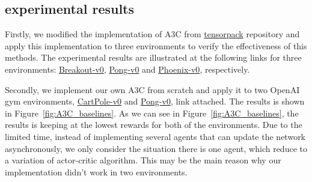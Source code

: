 \subsection{experimental results}
Firstly, we modified the implementation of A3C from \href{https://github.com/ppwwyyxx/tensorpack}{tensorpack} repository and
apply this implementation to three environments to verify the effectiveness of this methods.
The experimental results are illustrated at the following links for three environments:
\href{https://gym.openai.com/evaluations/eval_i9E40nAQuOTiSa0bxYBA#reproducibility}{Breakout-v0}, 
\href{https://gym.openai.com/evaluations/eval_mvXuxP13SSacO01UIhsg#reproducibility}{Pong-v0} and 
\href{https://gym.openai.com/evaluations/eval_Gva8XrEvTQi63KOd5Gyq1Q#reproducibility}{Phoenix-v0}, respectively.

Secondly, we implement our own A3C from scratch and apply it to two OpenAI gym environments, 
\href{https://github.com/KaixiangLin/project-DRL16/blob/master/baselines/myA3C/mainA3C.py}{CartPole-v0} and 
\href{https://github.com/KaixiangLin/project-DRL16/blob/master/baselines/myA3C/mainA3Ccartpole.py}{Pong-v0}, link attached.
The results is shown in Figure~\ref{fig:A3C_baselines}. As we can see in Figure~\ref{fig:A3C_baselines}, the 
results is keeping at the lowest rewards for both of the environments. 
Due to the limited time, instead of implementing several agents that can update the network asynchronously,
we only consider the situation there is one agent, which reduce to a variation of actor-critic algorithm.
This may be the main reason why our implementation didn't work in two environments.

